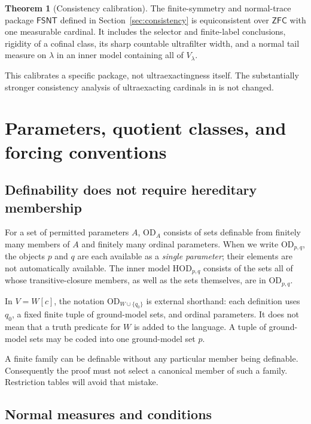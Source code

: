 \documentclass[11pt,letterpaper]{article}
\theoremstyle{definition}
\newtheorem{theorem}[definition]{Theorem}
\numberwithin{equation}{section}
\newcommand{\ZFC}{\mathsf{ZFC}}
\newcommand{\HOD}{\mathrm{HOD}}
\newcommand{\OD}{\mathrm{OD}}
\newcommand{\FinSym}{\mathsf{FSNT}}
\begin{document}
\begin{theorem}[Consistency calibration]\label{thm:consintro}
The finite-symmetry and normal-trace package $\FinSym$ defined in Section~\ref{sec:consistency} is equiconsistent over $\ZFC$ with one measurable cardinal. It includes the selector and finite-label conclusions, rigidity of a cofinal class, its sharp countable ultrafilter width, and a normal tail measure on $\lambda$ in an inner model containing all of $V_\lambda$.
\end{theorem}

This calibrates a specific package, not ultraexactingness itself. The substantially stronger consistency analysis of ultraexacting cardinals in \cite{abl,abgl} is not changed.

\section{Parameters, quotient classes, and forcing conventions}\label{sec:conventions}

\subsection{Definability does not require hereditary membership}

For a set of permitted parameters $A$, $\OD_A$ consists of sets definable from finitely many members of $A$ and finitely many ordinal parameters. When we write $\OD_{p,q}$, the objects $p$ and $q$ are each available as a \emph{single parameter}; their elements are not automatically available. The inner model $\HOD_{p,q}$ consists of the sets all of whose transitive-closure members, as well as the sets themselves, are in $\OD_{p,q}$.

In $V=W[c]$, the notation $\OD_{W\cup\{q_0\}}$ is external shorthand: each definition uses $q_0$, a fixed finite tuple of ground-model sets, and ordinal parameters. It does not mean that a truth predicate for $W$ is added to the language. A tuple of ground-model sets may be coded into one ground-model set $p$.

A finite family can be definable without any particular member being definable. Consequently the proof must not select a canonical member of such a family. Restriction tables will avoid that mistake.

\subsection{Normal measures and conditions}
\end{document}
